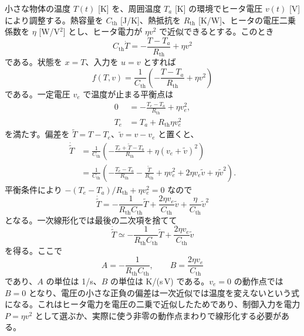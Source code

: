 \begin{example}[熱系の動作点まわりの線形化]
小さな物体の温度 $T(t)$ [K] を、周囲温度 $T_a$ [K] の環境でヒータ電圧 $v(t)$ [V] により調整する。熱容量を $C_{\mathrm{th}}$ [J/K]、熱抵抗を $R_{\mathrm{th}}$ [K/W]、ヒータの電圧二乗係数を $\eta$ [W/V$^2$] とし、ヒータ電力が $\eta v^2$ で近似できるとする。このとき
\begin{equation}
  C_{\mathrm{th}}\dot{T}
  =-\frac{T-T_a}{R_{\mathrm{th}}}+\eta v^2
\end{equation}
である。状態を $x=T$、入力を $u=v$ とすれば
\begin{equation}
  f(T,v)=\frac{1}{C_{\mathrm{th}}}
  \left(-\frac{T-T_a}{R_{\mathrm{th}}}+\eta v^2\right)
\end{equation}
である。一定電圧 $v_e$ で温度が止まる平衡点は
\begin{align}
  0&=-\frac{T_e-T_a}{R_{\mathrm{th}}}+\eta v_e^2,\\
  T_e&=T_a+R_{\mathrm{th}}\eta v_e^2
\end{align}
を満たす。偏差を $\tilde{T}=T-T_e$、$\tilde{v}=v-v_e$ と置くと、
\begin{align}
  \dot{\tilde{T}}
  &=\frac{1}{C_{\mathrm{th}}}
    \left(-\frac{T_e+\tilde{T}-T_a}{R_{\mathrm{th}}}
    +\eta(v_e+\tilde{v})^2\right)\\
  &=\frac{1}{C_{\mathrm{th}}}
    \left(-\frac{T_e-T_a}{R_{\mathrm{th}}}
    -\frac{\tilde{T}}{R_{\mathrm{th}}}
    +\eta v_e^2+2\eta v_e\tilde{v}+\eta\tilde{v}^2\right).
\end{align}
平衡条件により $-(T_e-T_a)/R_{\mathrm{th}}+\eta v_e^2=0$ なので
\begin{equation}
  \dot{\tilde{T}}
  =-\frac{1}{R_{\mathrm{th}}C_{\mathrm{th}}}\tilde{T}
   +\frac{2\eta v_e}{C_{\mathrm{th}}}\tilde{v}
   +\frac{\eta}{C_{\mathrm{th}}}\tilde{v}^2
\end{equation}
となる。一次線形化では最後の二次項を捨てて
\begin{equation}
  \dot{\tilde{T}}
  \simeq
  -\frac{1}{R_{\mathrm{th}}C_{\mathrm{th}}}\tilde{T}
  +\frac{2\eta v_e}{C_{\mathrm{th}}}\tilde{v}
\end{equation}
を得る。ここで
\begin{equation}
  A=-\frac{1}{R_{\mathrm{th}}C_{\mathrm{th}}},
  \qquad
  B=\frac{2\eta v_e}{C_{\mathrm{th}}}
\end{equation}
であり、$A$ の単位は 1/s、$B$ の単位は K/(s\,V) である。$v_e=0$ の動作点では $B=0$ となり、電圧の小さな正負の偏差は一次近似では温度を変えないという式になる。これはヒータ電力を電圧の二乗で近似したためであり、制御入力を電力 $P=\eta v^2$ として選ぶか、実際に使う非零の動作点まわりで線形化する必要がある。
\end{example}

